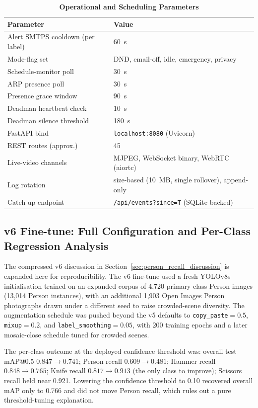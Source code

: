 \documentclass{ieeeaccess}
\begin{document}
\begin{table}[ht!]
\caption{\textbf{Operational and Scheduling Parameters}}
\label{tab:operational_params}
\setlength{\tabcolsep}{3pt}
\centering\footnotesize
\begin{tabular}{|l|p{4.0cm}|}
\hline
\textbf{Parameter} & \textbf{Value} \\
\hline
Alert SMTPS cooldown (per label) & 60~s \\
Mode-flag set & DND, email-off, idle, emergency, privacy \\
Schedule-monitor poll & 30~s \\
ARP presence poll & 30~s \\
Presence grace window & 90~s \\
Deadman heartbeat check & 10~s \\
Deadman silence threshold & 180~s \\
FastAPI bind & \texttt{localhost:8080} (Uvicorn) \\
REST routes (approx.) & 45 \\
Live-video channels & MJPEG, WebSocket binary, WebRTC (aiortc) \\
Log rotation & size-based (10~MB, single rollover), append-only \\
Catch-up endpoint & \texttt{/api/events?since=T} (SQLite-backed) \\
\hline
\end{tabular}
\end{table}


\subsection{v6 Fine-tune: Full Configuration and Per-Class Regression Analysis}
\label{sec:v6_details}
The compressed v6 discussion in Section~\ref{sec:person_recall_discussion} is expanded here for reproducibility. The v6 fine-tune used a fresh YOLOv8s initialisation trained on an expanded corpus of 4{,}720 primary-class Person images (13{,}014 Person instances), with an additional 1{,}903 Open Images Person photographs drawn under a different seed to raise crowded-scene diversity. The augmentation schedule was pushed beyond the v5 defaults to \texttt{copy\_paste}$=0.5$, \texttt{mixup}$=0.2$, and \texttt{label\_smoothing}$=0.05$, with 200 training epochs and a later mosaic-close schedule tuned for crowded scenes.

The per-class outcome at the deployed confidence threshold was: overall test mAP{@}0.5 $0.847 \to 0.741$; Person recall $0.609 \to 0.481$; Hammer recall $0.848 \to 0.765$; Knife recall $0.817 \to 0.913$ (the only class to improve); Scissors recall held near 0.921. Lowering the confidence threshold to 0.10 recovered overall mAP only to 0.766 and did not move Person recall, which rules out a pure threshold-tuning explanation.
\end{document}
